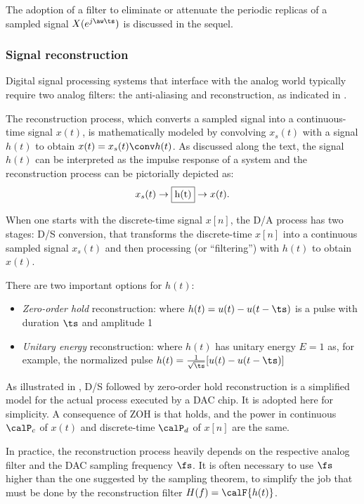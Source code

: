 The adoption of a filter to eliminate or attenuate the periodic replicas of 
a sampled signal $X(e^{j \aw \ts})$ is discussed in the sequel.

\subsubsection{Signal reconstruction}
Digital signal processing systems that interface with the analog world typically require two analog filters: the anti-aliasing and reconstruction, as indicated in .

The reconstruction process, which converts a sampled signal {\xs} into a continuous-time signal $x(t)$, is mathematically modeled by convolving $x_s(t)$ with a signal $h(t)$ to obtain $x(t) = x_s(t) \conv h(t)$. As discussed along the text, the signal $h(t)$ can be interpreted as the impulse response of a system and the reconstruction process can be pictorially depicted as:
\begin{equation}
x_s(t) \rightarrow\fbox{h(t)}\rightarrow x(t).
\label{eq:signalReconstruction}
\end{equation}

When one starts with the discrete-time signal $x[n]$, the D/A process has two stages: D/S conversion, that transforms the discrete-time $x[n]$ into a continuous sampled signal $x_s(t)$ and then processing (or ``filtering'') with $h(t)$ to obtain $x(t)$.

There are two important options for $h(t)$:

\begin{itemize}
        \item \emph{Zero-order hold} reconstruction: where $h(t) = u(t) - u(t-\ts)$ is a pulse with duration $\ts$ and amplitude 1
        \item \emph{Unitary energy} reconstruction: where $h(t)$ has unitary energy $E=1$ as, for example, the normalized pulse $h(t) = \frac{1}{\sqrt{\ts}} [u(t) - u(t-\ts)]$
\end{itemize}

As illustrated in , D/S followed by zero-order hold reconstruction is a simplified model for the actual process executed by a DAC chip. It is adopted here for simplicity. A consequence of ZOH
is that  holds, and the power in continuous
$\calP_c$ of $x(t)$ and discrete-time $\calP_d$ of $x[n]$ are the same.

In practice, the reconstruction process heavily depends on the respective analog filter and the DAC sampling frequency $\fs$. It is often necessary to use $\fs$ higher than the one suggested by the sampling theorem, to simplify the job that must be done by the reconstruction filter $H(f) = \calF \{h(t)\}$.

